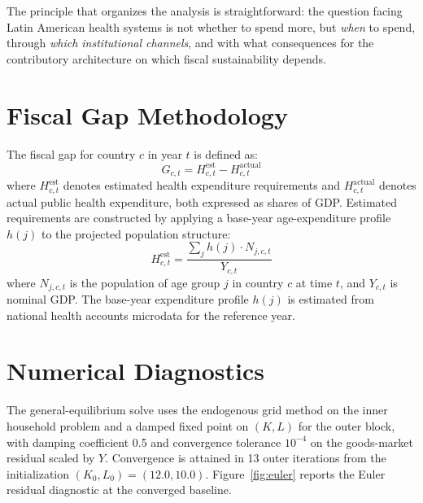 \documentclass[12pt,a4paper]{article}
\begin{document}
The principle that organizes the analysis is straightforward: the question facing Latin American health systems is not whether to spend more, but \textit{when} to spend, through \textit{which institutional channels}, and with what consequences for the contributory architecture on which fiscal sustainability depends.


\begin{appendices}

\section{Fiscal Gap Methodology}
\label{app:fiscal_gap}

The fiscal gap for country $c$ in year $t$ is defined as:
\begin{equation}
\label{eq:fiscal_gap}
G_{c,t} = H_{c,t}^{\text{est}} - H_{c,t}^{\text{actual}}
\end{equation}
where $H_{c,t}^{\text{est}}$ denotes estimated health expenditure requirements and $H_{c,t}^{\text{actual}}$ denotes actual public health expenditure, both expressed as shares of GDP. Estimated requirements are constructed by applying a base-year age-expenditure profile $h(j)$ to the projected population structure:
\begin{equation}
\label{eq:fiscal_gap_est}
H_{c,t}^{\text{est}} = \frac{\sum_j h(j) \cdot N_{j,c,t}}{Y_{c,t}}
\end{equation}
where $N_{j,c,t}$ is the population of age group $j$ in country $c$ at time $t$, and $Y_{c,t}$ is nominal GDP. The base-year expenditure profile $h(j)$ is estimated from national health accounts microdata for the reference year.


\section{Numerical Diagnostics}
\label{app:diagnostics}

The general-equilibrium solve uses the endogenous grid method on the
inner household problem and a damped fixed point on $(K, L)$ for the
outer block, with damping coefficient 0.5 and convergence tolerance
$10^{-4}$ on the goods-market residual scaled by $Y$. Convergence is
attained in 13 outer iterations from the initialization
$(K_{0}, L_{0}) = (12.0, 10.0)$. Figure~\ref{fig:euler} reports the
Euler residual diagnostic at the converged baseline.


\end{appendices}
\end{document}
